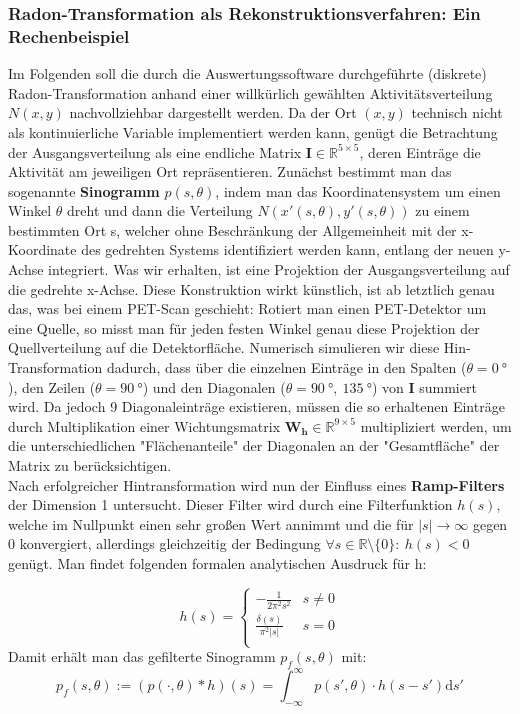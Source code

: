         \subsubsection{Radon-Transformation als Rekonstruktionsverfahren: Ein Rechenbeispiel} \label{dfs:Radon}
        Im Folgenden soll die durch die Auswertungssoftware durchgeführte (diskrete) Radon-Transformation anhand einer willkürlich gewählten Aktivitätsverteilung $N(x,y)$ nachvollziehbar dargestellt werden. Da der Ort $(x,y)$ technisch nicht als kontinuierliche Variable implementiert werden kann, genügt die Betrachtung der Ausgangsverteilung als eine endliche Matrix $\boldsymbol{I} \in \mathbb{R}^{5 \times 5}$, deren Einträge die Aktivität am jeweiligen Ort repräsentieren. Zunächst bestimmt man das sogenannte \textbf{Sinogramm} $p(s, \theta)$, indem man das Koordinatensystem um einen Winkel $\theta$ dreht und dann die Verteilung $N(x'(s,\theta),y'(s,\theta))$ zu einem bestimmten Ort s, welcher ohne Beschränkung der Allgemeinheit mit der x-Koordinate des gedrehten Systems identifiziert werden kann, entlang der neuen y-Achse integriert. Was wir erhalten, ist eine Projektion der Ausgangsverteilung auf die gedrehte x-Achse. Diese Konstruktion wirkt künstlich, ist ab letztlich genau das, was bei einem PET-Scan geschieht: Rotiert man einen PET-Detektor um eine Quelle, so misst man für jeden festen Winkel genau diese Projektion der Quellverteilung auf die Detektorfläche. Numerisch simulieren wir diese Hin-Transformation dadurch, dass über die einzelnen Einträge in den Spalten ($\theta = 0\ \unit{°}$), den Zeilen ($\theta = 90\ \unit{°}$) und den Diagonalen ($\theta = 90\ \unit{°},\ 135\ \unit{°}$) von $\boldsymbol{I}$ summiert wird. Da jedoch 9 Diagonaleinträge existieren, müssen die so erhaltenen Einträge durch Multiplikation einer Wichtungsmatrix $\boldsymbol{W_h} \in \mathbb{R}^{9 \times 5}$ multipliziert werden, um die unterschiedlichen "Flächenanteile" der Diagonalen an der "Gesamtfläche" der Matrix zu berücksichtigen.\\
        Nach erfolgreicher Hintransformation wird nun der Einfluss eines \textbf{Ramp-Filters} der Dimension 1 untersucht. Dieser Filter wird durch eine Filterfunktion $h(s)$, welche im Nullpunkt einen sehr großen Wert annimmt und die für $|s|\longrightarrow \infty$ gegen 0 konvergiert, allerdings gleichzeitig der Bedingung $\forall s \in \mathbb{R}\setminus\{0\}:\ h(s) < 0$ genügt. Man findet folgenden formalen analytischen Ausdruck für h:
        
        \begin{equation*}
        	h(s) = \begin{cases}
        				- \frac{1}{2 \pi^2 s^2} & s \neq 0\\
        				\frac{\delta(s)}{\pi^2 |s|} & s = 0\\
        			\end{cases}
        \end{equation*}
        Damit erhält man das gefilterte Sinogramm $p_f(s,\theta)$ mit:
        \begin{equation*}
                	p_f(s,\theta) := (p(\cdot, \theta) \ast h) (s) = \int_{-\infty}^{\infty}  p(s', \theta) \cdot h(s-s') \mathrm{d}s'
        \end{equation*}
        

